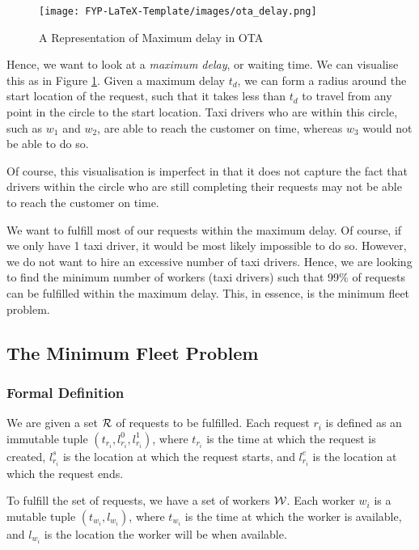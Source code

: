\documentclass[urop]{socreport}
\begin{document}
\begin{figure}[h]
    \centering
    \texttt{[image: FYP-LaTeX-Template/images/ota\_delay.png]}
    \caption{A Representation of Maximum delay in OTA}
    \label{fig:maxixumdelay}
\end{figure}

Hence, we want to look at a \textit{maximum delay}, or waiting time. We can visualise this as in Figure \ref{fig:maxixumdelay}. Given a maximum delay $t_d$, we can form a radius around the start location of the request, such that it takes less than $t_d$ to travel from any point in the circle to the start location. Taxi drivers who are within this circle, such as $w_1$ and $w_2$, are able to reach the customer on time, whereas $w_3$ would not be able to do so.

Of course, this visualisation is imperfect in that it does not capture the fact that drivers within the circle who are still completing their requests may not be able to reach the customer on time.

We want to fulfill most of our requests within the maximum delay. Of course, if we only have 1 taxi driver, it would be most likely impossible to do so. However, we do not want to hire an excessive number of taxi drivers. Hence, we are looking to find the minimum number of workers (taxi drivers) such that 99\% of requests can be fulfilled within the maximum delay. This, in essence, is the minimum fleet problem. 

\subsection{The Minimum Fleet Problem}
\subsubsection{Formal Definition}
\label{prelim}
We are given a set $\mathcal{R}$ of requests to be fulfilled. Each request $r_i$ is defined as an immutable tuple $(t_{r_i}, l_{r_i}^0, l_{r_i}^1)$, where $t_{r_i}$ is the time at which the request is created, $l_{r_i}^s$ is the location at which the request starts, and $l_{r_i}^e$ is the location at which the request ends. 

To fulfill the set of requests, we have a set of workers $\mathcal{W}$. Each worker $w_i$ is a mutable tuple $(t_{w_i}, l_{w_i})$, where $t_{w_i}$ is the time at which the worker is available, and $l_{w_i}$ is the location the worker will be when available.
\end{document}
